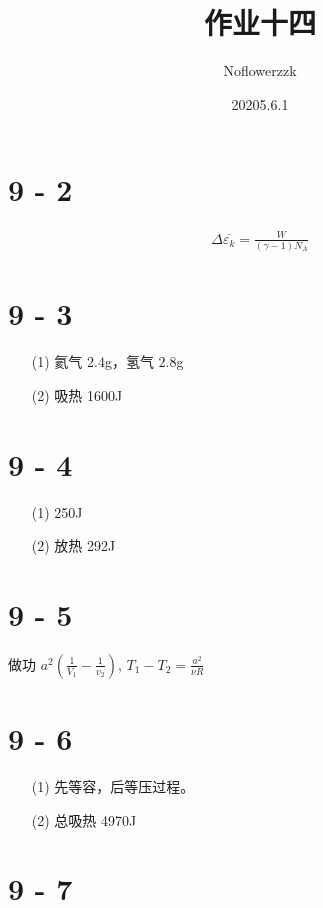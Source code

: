 \documentclass{article}
\title{作业十四}
\author{Noflowerzzk}
\date{20205.6.1}
\begin{document}
\maketitle

\section*{9 - 2}

\begin{align*}
    \Delta \overline{\varepsilon_k} = \frac{W}{(\gamma - 1)N_A}
\end{align*}

\section*{9 - 3}

\begin{itemize}
    \item [(1)] 氦气 $2.4$g，氢气 $2.8$g
    \item [(2)] 吸热 1600J
\end{itemize}

\section*{9 - 4}

\begin{itemize}
    \item [(1)] 250J
    \item [(2)] 放热 292J
\end{itemize}

\section*{9 - 5}

做功 $a^2\left(\frac{1}{V_1} - \frac{1}{v_2}\right)$, $T_1 - T_2 = \frac{a^2}{\nu R}$

\section*{9 - 6}

\begin{itemize}
    \item [(1)] 先等容，后等压过程。
    \item [(2)] 总吸热 4970J
\end{itemize}

\section*{9 - 7}
\end{document}
